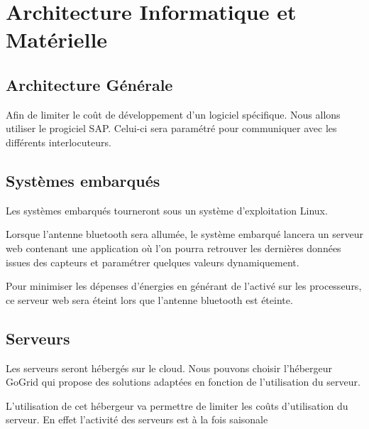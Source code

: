 \section{Architecture Informatique et Matérielle}

\subsection{Architecture Générale}
Afin de limiter le coût de développement d'un logiciel spécifique. 
Nous allons utiliser le progiciel SAP. Celui-ci sera paramétré pour
communiquer avec les différents interlocuteurs. 

\subsection{Systèmes embarqués}

Les systèmes embarqués tourneront sous un système d'exploitation Linux. 

Lorsque l'antenne bluetooth sera allumée, le système embarqué lancera un serveur web
contenant une application où l'on pourra retrouver les dernières données issues
des capteurs et paramétrer quelques valeurs dynamiquement. 

Pour minimiser les dépenses d'énergies en générant de l'activé sur les processeurs, 
ce serveur web sera éteint lors que l'antenne bluetooth est éteinte. 


\subsection{Serveurs}

Les serveurs seront hébergés sur le cloud. Nous pouvons choisir l'hébergeur GoGrid 
qui propose des solutions adaptées en fonction de l'utilisation du serveur.

L'utilisation de cet hébergeur va permettre de limiter les coûts d'utilisation du serveur. 
En effet l'activité des serveurs est à la fois saisonale

